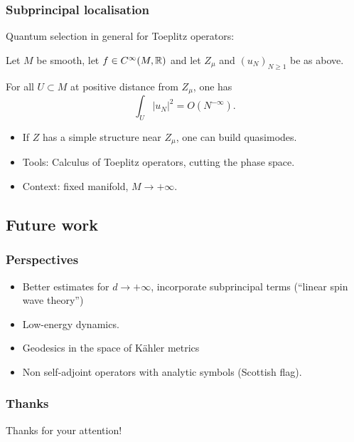 \documentclass[mathserif]{beamer}
\newcommand{\mycite}[1]{{\color{mygreen} \small #1}}
\begin{document}
\begin{frame}
  \frametitle{Subprincipal localisation}
  Quantum selection in general for Toeplitz operators:
  \begin{theorem}[\mycite{[\underline{D. 2020?}]}]
    Let $M$ be smooth, let $f\in C^{\infty}(M,\mathbb{R})$ and let $Z_{\mu}$ and
    $(u_N)_{N\geq 1}$ be as above.

    For all $U\subset M$ at positive distance from $Z_{\mu}$, one has
    \[
      \int_U
      |u_N|^2=O(N^{-\infty}).
      \]
    \end{theorem}

    \begin{itemize}
      \item If $Z$ has a simple structure near $Z_{\mu}$, one can build
        quasimodes.
        \item Tools: Calculus of Toeplitz operators, cutting the phase
          space.
        \item Context: fixed manifold, $M\to +\infty$.\
        \end{itemize}
        
    
\end{frame}

 \subsection{Future work}
\begin{frame}
  \frametitle{Perspectives}
    \begin{itemize}
    \item Better estimates for $d \to +\infty$, incorporate
      subprincipal terms (``linear spin wave theory'')
    \item Low-energy dynamics.
    \item Geodesics in the space of Kähler metrics
    \item Non self-adjoint operators with analytic symbols (Scottish flag).
    \end{itemize}
  \end{frame}

  \begin{frame}
    \frametitle{Thanks}
    \centering 
    {\Large Thanks for your attention!}
  \end{frame}
\end{document}
